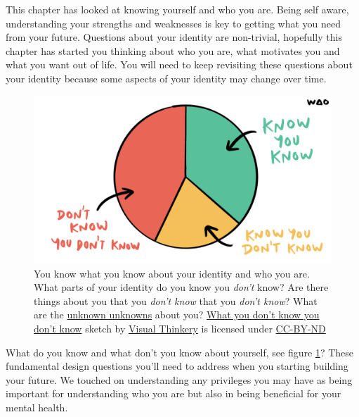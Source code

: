 \documentclass[
]{book}
\begin{document}
This chapter has looked at knowing yourself and who you are. Being self aware, understanding your strengths and weaknesses is key to getting what you need from your future. Questions about your identity are non-trivial, hopefully this chapter has started you thinking about who you are, what motivates you and what you want out of life. You will need to keep revisiting these questions about your identity because some aspects of your identity may change over time.

\begin{figure}

{\centering \includegraphics[width=1\linewidth]{images/you-dont-know-you-dont-know} 

}

\caption{You know what you know about your identity and who you are. What parts of your identity do you know you \emph{don't} know? Are there things about you that you \emph{don't know} that you \emph{don't know}? What are the \href{https://en.wikipedia.org/wiki/There_are_known_knowns}{unknown unknowns} about you? \href{https://bryanmmathers.com/what-you-dont-know-you-dont-know}{What you don't know you don't know} sketch by \href{https://visualthinkery.com/}{Visual Thinkery} is licensed under \href{https://creativecommons.org/licenses/by-nd/4.0/}{CC-BY-ND}}\label{fig:mathers-known-fig}
\end{figure}



What do you know and what don't you know about yourself, see figure \ref{fig:mathers-known-fig}? These fundamental design questions you'll need to address when you starting building your future. We touched on understanding any privileges you may have as being important for understanding who you are but also in being beneficial for your mental health.
\end{document}
